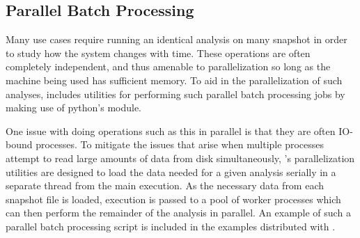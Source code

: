 \subsection{Parallel Batch Processing}
\label{sec:parallel}
Many  use cases require running an identical analysis on many snapshot in order to study how the system changes with time.  
These operations are often completely independent, and thus amenable to parallelization so long as the machine being used has sufficient memory.
To aid in the parallelization of such analyses,  includes utilities for performing such parallel batch processing jobs by making use of python's  module. 

One issue with doing operations such as this in parallel is that they are often IO-bound processes.
To mitigate the issues that arise when multiple processes attempt to read large amounts of data from disk simultaneously, 's parallelization utilities are designed to load the data needed for a given analysis serially in a separate thread from the main execution. 
As the necessary data from each snapshot file is loaded, execution is passed to a pool of worker processes which can then perform the remainder of the analysis in parallel.  An example of such a parallel batch processing script is included in the examples distributed with .